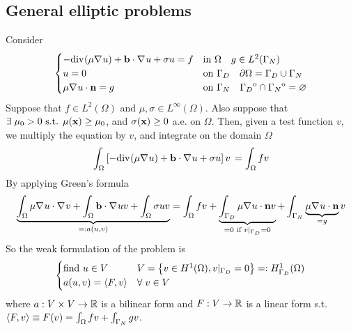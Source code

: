\subsection*{General elliptic problems}
Consider 
\begin{equation}
    \begin{cases}
        -\text{div}\mspace{1mu}(\mu \nabla\mspace{1mu} u)+ \textbf{b}\cdot \nabla\mspace{1mu} u + \sigma u = f& \text{in } \Omega \quad g \in L^2(\Gamma_N) \\
        u = 0 & \text{on }\Gamma_D \quad \partial\Omega = \Gamma_D \cup \Gamma_N \\

        \mu \nabla\mspace{1mu} u \cdot \textbf{n} = g & \text{on } \Gamma_N \quad {\kern0pt\Gamma_D}^{\mathrm{o}} \cap {\kern0pt\Gamma_N}^{\mathrm{o}} = \varnothing
    \end{cases}
\end{equation}
Suppose that \(f \in L^2(\Omega)\) and \(\mu, \sigma \in L^\infty(\Omega)\). Also suppose that \(\exists \; \mu_0 > 0 \text{ s.t. } \mu(\textbf{x}) \geq \mu_0\), and \(\sigma(\textbf{x}) \geq 0\) a.e. on \(\Omega\).  
Then, given a test function \(v\), we multiply the equation by \(v\), and integrate on the domain \(\Omega\)
\begin{equation*}
    \int_\Omega \left[-\text{div}\mspace{1mu}(\mu \nabla\mspace{1mu} u)+ \textbf{b}\cdot \nabla\mspace{1mu} u + \sigma u\right] v \,  = \int_\Omega f v 
\end{equation*}
By applying Green's formula 
\begin{equation*}
    \underbrace{\int_\Omega \mu\nabla\mspace{1mu} u \cdot \nabla\mspace{1mu} v  + \int_\Omega \textbf{b} \cdot \nabla\mspace{1mu} u v + \int_\Omega \sigma u v}_{=: a(u,v)} = \int_\Omega f v +\underbrace{\int_{\Gamma_D} \mu \nabla\mspace{1mu} u \cdot \textbf{n} v}_{= 0 \text{ if } v\vert_{\Gamma_D} = 0} + \int_{\Gamma_N} \underbrace{\mu \nabla\mspace{1mu} u \cdot \textbf{n}}_{= g} v 
\end{equation*}
So the weak formulation of the problem is 
\begin{equation}
    \begin{cases}
        \text{find } u \in V & V = \left\{v \in H^1(\Omega), v\vert_{\Gamma_D} = 0\right\} =: H^1_{\Gamma_D}(\Omega)\\
        a(u,v) = \langle F,v \rangle & \forall \; v \in V \label{Weak Formulation of Boundary Value Problems}
    \end{cases}
\end{equation}
where \(a: V \times V \to \mathbb{R}\) is a bilinear form and \(F:V \to \mathbb{R}\) is a linear form s.t. \(\langle F,v \rangle \equiv F(v) = \int_\Omega fv + \int_{\Gamma_N} gv\).
